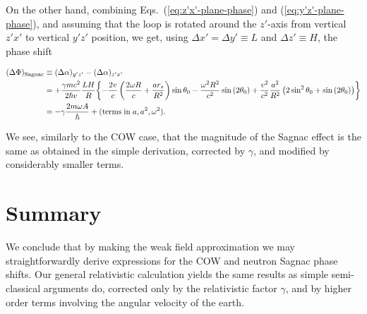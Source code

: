\documentclass[twocolumn,reprint,amsmath,amssymb]{revtex4}
\def\BWT{\begin{widetext}}
\def\EWT{\end{widetext}}
\def\a{\alpha}
\begin{document}
On the other hand, combining Eqs.\ (\ref{eq:z'x'-plane-phase}) 
and (\ref{eq:y'z'-plane-phase}),
and assuming that the loop is rotated around the $z'$-axis 
from vertical $z'x'$ to vertical $y'z'$
position, we get, using $\Delta x' = \Delta y' \equiv L$ 
and $\Delta z' \equiv H$, the phase shift
\BWT
\begin{align}
\label{eq:Sagnac-phase}
(\Delta \Phi)_{\rm Sagnac} &\equiv (\Delta \a)_{y'z'} - (\Delta \a)_{z'x'}
\nonumber \\
&=
+\frac{\gamma mc^2}{2\hbar v}
\frac{LH}{R}
\biggl\{
- 
\frac{2v}{c}
\left(
\frac{2\omega R }{c}+ \frac{a {r_s}}{R^2}
\right)\sin\theta_0 
-
\frac{{\omega}^2 R^2}{c^2}  \sin \left(2\theta_0\right)
+
\frac{v^2}{c^2}
\frac{a^2}{R^2} 
\left(2\sin^2\theta_0  + \sin \left(2\theta_0\right)\right)
\biggr\}
\nonumber \\
&= - \gamma \frac{2m\omega A}{\hbar} + ({\rm terms\; in\;} a, a^2, \omega^2).
\end{align}
\EWT
We see, similarly to the COW case, that the magnitude of the Sagnac effect is the
same as obtained in the simple derivation, corrected by $\gamma$, and modified by
considerably smaller terms.





\section{Summary}

We conclude that by making the weak field approximation we may straightforwardly derive expressions for the COW and neutron Sagnac phase shifts. Our general relativistic calculation yields the same results as simple semi-classical arguments do, corrected only by the relativistic factor $\gamma$, and by higher order terms involving the angular velocity of the earth.


\end{document}
